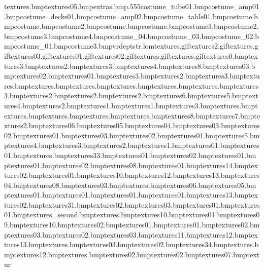 textures\supermarketwindow.bmp textures\leading05.bmp extras\map.bmp.555 costume\mtweety_tube01.bmp costume\gblaster_amp01.bmp costume\gblaster_decks01.bmp costume\gblaster_amp02.bmp costume\gblaster_table01.bmp costume\hutposts.bmp costume\hutwood.bmp costume\bodyeyebrow2.bmp costume\noseshine.bmp costume\muzzlestubble.bmp costume\eyetex3.bmp costume\earslined2.bmp costume\bodytoes3.bmp costume\tongueline4.bmp costume\basketballshirt_04.bmp costume\basketballshirt_03.bmp costume\basketballshirt_02.bmp costume\basketballshirt_01.bmp costume\baseballlogo3.bmp vrdeptstr.lom textures\blackholemonitors.gif textures\tvsnow2.gif textures\light.gif textures\shoptvflash03.gif textures\shoptvflash01.gif textures\shoptvflash02.gif textures\shoptvwowtv.gif textures\shopadverts.gif textures\keys0.bmp textures\tvbits3.bmp textures\clothes2.bmp textures\clothes3.bmp textures\clothes4.bmp textures\clothes8.bmp textures\gumball03.bmp textures\gumball02.bmp textures\gumball01.bmp textures\green3.bmp textures\green2.bmp textures\red3.bmp textures\hotdog.bmp textures\icecream.bmp textures\doughnut.bmp textures\ketchup.bmp textures\cereal.bmp textures\cake.bmp textures\blue3.bmp textures\blue2.bmp textures\red2.bmp textures\yellow2.bmp textures\tvbits6.bmp textures\tvbits5.bmp textures\tvbits4.bmp textures\tvbits2.bmp textures\tvbits1.bmp textures\white1.bmp textures\white3.bmp textures\battery.bmp textures\crowbar.bmp textures\till.bmp textures\screw.bmp textures\monitor.bmp textures\tvbits8.bmp textures\tvbits7.bmp textures\white2.bmp textures\splinter06.bmp textures\splinter05.bmp textures\splinter04.bmp textures\splinter03.bmp textures\splinter02.bmp textures\splinter01.bmp textures\feather03.bmp textures\feather02.bmp textures\feather01.bmp textures\bombbit5.bmp textures\bombbit4.bmp textures\bombbit3.bmp textures\bombbit2.bmp textures\bombbit1.bmp textures\fizzydrink01.bmp textures\crisps01.bmp textures\cheese.bmp textures\ceramictile33.bmp textures\sportsnbo01.bmp textures\ceramictile02.bmp textures\shopfloorsamat01.bmp textures\market01.bmp textures\market02.bmp textures\ceramictile08.bmp textures\walljoiner01.bmp textures\leading14.bmp textures\walljoiner02.bmp textures\signtoy01.bmp textures\leading10.bmp textures\shopdanger12.bmp textures\shopdanger13.bmp textures\leading04.bmp textures\leading08.bmp textures\deptlight03.bmp textures\citytarmac.bmp textures\ceramictile06.bmp textures\ceramictile05.bmp textures\barsblue01.bmp textures\ceramictile01.bmp textures\water01.bmp textures\chubneon01.bmp textures\leading13.bmp textures\signsports02.bmp textures\ceramictile31.bmp textures\barsblue02.bmp textures\barsblue03.bmp textures\leading01.bmp textures\glass01.bmp textures\city_second.bmp textures\citythird.bmp textures\sportsnfl10.bmp textures\sportsglove01.bmp textures\shopdanger09.bmp textures\shopdanger10.bmp textures\sportsglove02.bmp textures\martcheck01.bmp textures\sportsball01.bmp textures\sportsball02.bmp textures\leading03.bmp textures\leading02.bmp textures\chubsafe03.bmp textures\sportsnfl11.bmp textures\sportsnfl12.bmp textures\sportsnfl13.bmp textures\toytrax.bmp textures\toywall03.bmp textures\toywall02.bmp textures\ceramictile34.bmp textures\mat.bmp textures\leading12.bmp textures\signsports.bmp textures\winhandle02.bmp textures\winstar02.bmp textures\leading07.bmp textur